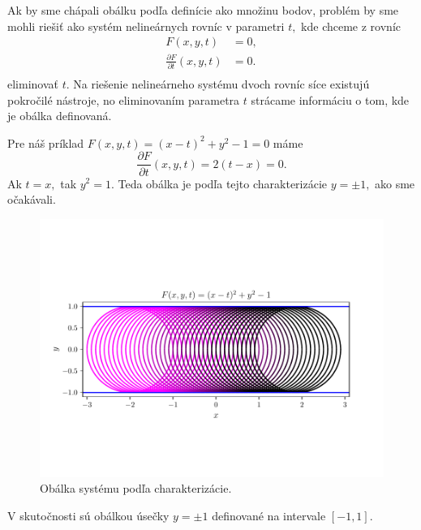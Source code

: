 Ak by sme chápali obálku podľa definície ako množinu bodov, problém by sme mohli riešiť ako systém nelineárnych rovníc v parametri $t,$ kde chceme z rovníc 
\begin{align*}
F(x,y,t) &= 0, \\
\frac{\partial F}{\partial t}(x, y, t) &= 0. \\
\end{align*}
eliminovať $t.$ Na riešenie nelineárneho systému dvoch rovníc síce existujú pokročilé nástroje, no eliminovaním parametra $t$ strácame informáciu o tom, kde je obálka definovaná. 

\begin{example}
Pre náš príklad $ F(x, y, t) = (x - t)^2 + y^2 - 1 = 0 $ máme 
$$\frac{\partial F}{\partial t}(x, y, t) = 2(t-x) = 0. $$
Ak $t = x, $ tak $y^2 = 1.$ Teda obálka je podľa tejto charakterizácie $ y = \pm 1, $ ako sme očakávali.
\end{example}

\begin{figure}[H]
	\centering
	\includegraphics[trim={0 1.65cm 0 2cm},clip]{images/system_with_envelope_unlimited_domain.pdf}
	\caption{Obálka systému podľa charakterizácie.}
	\label{fig:system_with_envelope_unlimited_domain}
\end{figure}

V skutočnosti sú obálkou úsečky $y=\pm 1$ definované na intervale $[-1,1]$.

